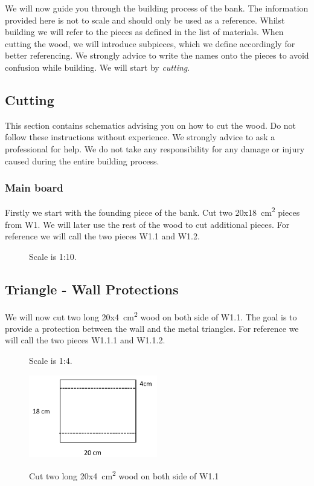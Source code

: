 \documentclass{subfiles}
\begin{document}
    We will now guide you through the building process of the bank. The information provided here is not to scale and should only be used as a reference. Whilst building we will refer to the pieces as defined in the list of materials. When cutting the wood, we will introduce subpieces, which we define accordingly for better referencing. We strongly advice to write the names onto the pieces to avoid confusion while building. We will start by \emph{cutting}.

    \subsection{Cutting}
        This section contains schematics advising you on how to cut the wood. Do not follow these instructions without experience. We strongly advice to ask a professional for help. We do not take any responsibility for any damage or injury caused during the entire building process.

    \subsubsection*{Main board}
    Firstly we start with the founding piece of the bank. Cut two 20x18\SI{}{\square\centi\meter} pieces from W1.
    We will later use the rest of the wood to cut additional pieces. For reference we will call the two pieces W1.1 and W1.2.
    \begin{figure}[H]
        \centering
        
        \caption{Scale is 1:10.}
    \end{figure}


    \subsection*{Triangle - Wall Protections}
    We will now cut two long 20x4\SI{}{\square\centi\meter} wood on both side of W1.1. The goal is to 
    provide a protection between the wall and the metal triangles. For reference we will call the two pieces W1.1.1 and W1.1.2.
    \begin{figure}[H]
        \centering
        
        \caption{Scale is 1:4.}
    \end{figure}
    \begin{figure}[h]
        \centering
        \includegraphics[width=0.5\textwidth]{Ressources/Cut_W1_1.png}
        \label{fig:Cut_W1_1}
        \caption{Cut two long 20x4\SI{}{\square\centi\meter} wood on both side of W1.1}
    \end{figure}
\end{document}
